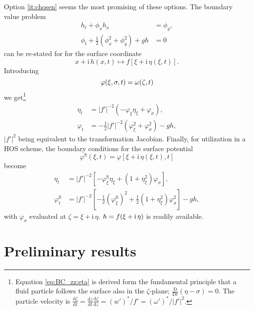 \documentclass[a4paper,12pt]{article}
\newcommand{\mr}{\mathrm}
\renewcommand{\S}{^\mr{S}}
\newcommand{\ii}{\mr{i}\,}
\renewcommand{\_}[1]{_\mr{#1}}
\let\Re\relax
\let\Im\relax
\DeclareMathOperator\Re{Re}
\DeclareMathOperator\Im{Im}
\newcommand{\w}{w}
\newcommand{\rbr}[1]{\left(#1\right)}
\newcommand{\sbr}[1]{\left[#1\right]}
\newcommand{\z}{z}
\newcommand{\x}{x}
\newcommand{\zz}{\zeta}
\newcommand{\xx}{\xi}
\newcommand{\yy}{\sigma}
\newcommand{\zmap}{f}
\newcommand{\ww}{\omega}
\renewcommand{\w}{w}
\newcommand{\dd}[2]{\frac{\mr d #1}{\mr d #2}}
\begin{document}
Option \ref{it:chosen} seems the most promising of these options.
The boundary value problem 
\begin{align*}
h_t + \phi_x h_x&=\phi_y,\\
\phi_t + \frac12\rbr{\phi_x^2+\phi_y^2}+gh&=0
\end{align*}
can be re-stated for for the surface coordinate
\[
\x+\ii h(\x,t) \mapsto f[\xx+\ii \eta(\xx,t)].
\]
Introducing
\[\varphi(\xx,\yy,t)=\Re\ww(\zz,t) \]
we get\footnote{
Equation \eqref{eq:BC_zz:eta} is derived form the fundamental principle that a fluid particle follows the surface also in the $\zz$-plane; $\frac{\mr D}{\mr D t}(\eta-\yy)=0$. The particle velocity is 
$\dd\zz t = \dd\z t \dd\zz\z =(\w')^*/f'=(\ww')^*\big/|f'|^2$.
}
\begin{subequations}
\begin{align}
\eta_t &= |\zmap'|^{-2}  \rbr{ -  \varphi_\xx\eta_\xx  +  \varphi_\yy}, \label{eq:BC_zz:eta} \\
\varphi_t &=   - \frac12 |\zmap'|^{-2} \rbr{\varphi_\xx^2+\varphi_\yy^2}  - g h,
\end{align}%
\label{eq:BC_zz}%
\end{subequations}%
$|\zmap'|^{2}$ being equivalent to the transformation Jacobian. 
Finally, for utilization in a HOS scheme, the boundary conditions for the surface potential 
\[
\varphi\S(\xx,t)=\varphi[\xx+\ii\eta(\xx,t),t]
\]
become
\begin{subequations}
\begin{align}
\eta_t &= |\zmap'|^{-2} \sbr{-   \varphi\S_\xx\eta_\xx + (1+\eta_\xx^2) \varphi_\yy},\\
\varphi\S_t  &= |\zmap'|^{-2}\sbr{ - \frac12  \rbr{\varphi\S_\xx}^2 + \frac12 (1+\eta_\xx^2) \varphi_\yy^2 }  - g h,
\end{align}%
\end{subequations}%
with  $\varphi_\yy$ evaluated at $\zz=\xx+\ii\eta$.
$h=\Im \zmap(\xx+\ii\eta)$ is readily available. 

\section{Preliminary results}
\label{sec:results}








\end{document}
